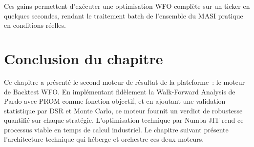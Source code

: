 Ces gains permettent d'exécuter une optimisation WFO complète sur un ticker en
quelques secondes, rendant le traitement batch de l'ensemble du MASI pratique
en conditions réelles.

\section*{Conclusion du chapitre}

Ce chapitre a présenté le second moteur de résultat de la plateforme~: le moteur
de Backtest WFO. En implémentant fidèlement la Walk-Forward Analysis de Pardo avec
PROM comme fonction objectif, et en ajoutant une validation statistique par DSR et
Monte Carlo, ce moteur fournit un verdict de robustesse quantifié sur chaque stratégie.
L'optimisation technique par Numba JIT rend ce processus viable en temps de calcul
industriel. Le chapitre suivant présente l'architecture technique qui héberge et
orchestre ces deux moteurs.
